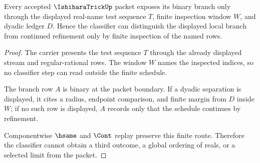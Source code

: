 \begin{theorem}
\label{thm:ishihara-trick-finite-test-boundary}
Every accepted $\IshiharaTrickUp$ packet exposes its binary branch only through the displayed real-name test sequence $T$, finite inspection window $W$, and dyadic ledger $D$. Hence the classifier can distinguish the displayed local branch from continued refinement only by finite inspection of the named rows.
\end{theorem}
\begin{proof}
The carrier presents the test sequence $T$ through the already displayed stream and regular-rational rows. The window $W$ names the inspected indices, so no classifier step can read outside the finite schedule.

The branch row $A$ is binary at the packet boundary. If a dyadic separation is displayed, it cites a radius, endpoint comparison, and finite margin from $D$ inside $W$; if no such row is displayed, $A$ records only that the schedule continues by refinement.

Componentwise $\hsame$ and $\Cont$ replay preserve this finite route. Therefore the classifier cannot obtain a third outcome, a global ordering of reals, or a selected limit from the packet.
\end{proof}

